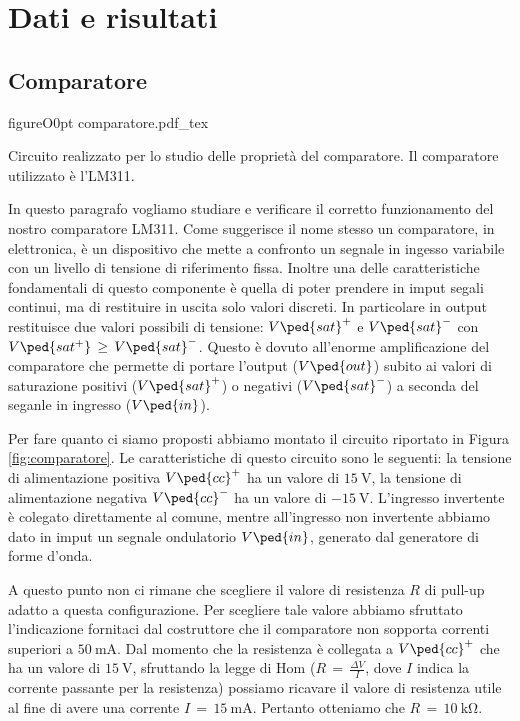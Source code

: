 \section*{Dati e risultati}

\subsection*{Comparatore}

\begin{wrapfloat}{figure}{O}{0pt}
        \def\svgwidth{0.45\textwidth}
        {comparatore.pdf_tex}
        \caption{Circuito realizzato per lo studio delle proprietà del comparatore. Il comparatore utilizzato è l'LM311.}
        \label{fig:comparatore}
\end{wrapfloat}

In questo paragrafo vogliamo studiare e verificare il corretto funzionamento del nostro comparatore LM311. Come suggerisce il nome stesso un comparatore, in elettronica, è un dispositivo che mette a confronto un segnale in ingesso variabile con un livello di tensione di riferimento fissa. Inoltre una delle caratteristiche fondamentali di questo componente è quella di poter prendere in imput segali continui, ma di restituire in uscita solo valori discreti. In particolare in output restituisce due valori possibili di tensione: $V\ped{sat}^+$ e $V\ped{sat}^-$ con $V\ped{sat^+}\,\geq\,V\ped{sat}^-$. Questo è dovuto all'enorme amplificazione del comparatore che permette di portare l'output ($V\ped{out}$) subito ai valori di saturazione positivi ($V\ped{sat}^+$) o negativi ($V\ped{sat}^-$) a seconda del seganle in ingresso ($V\ped{in}$).

Per fare quanto ci siamo proposti abbiamo montato il circuito riportato in Figura \ref{fig:comparatore}. Le caratteristiche di questo circuito sono le seguenti: la tensione di alimentazione positiva $V\ped{cc}^+$ ha un valore di $\SI{+15}{\volt}$, la tensione di alimentazione negativa $V\ped{cc}^-$ ha un valore di $\SI{-15}{\volt}$. L'ingresso invertente è colegato direttamente al comune, mentre all'ingresso non invertente abbiamo dato in imput un segnale ondulatorio $V\ped{in}$, generato dal generatore di forme d'onda.

A questo punto non ci rimane che scegliere il valore di resistenza $R$ di pull-up adatto a questa configurazione. Per scegliere tale valore abbiamo sfruttato l'indicazione fornitaci dal costruttore che il comparatore non sopporta correnti superiori a $\SI{50}{\milli\ampere}$. Dal momento che la resistenza è collegata a $V\ped{cc}^+$ che ha un valore di $\SI{+15}{\volt}$, sfruttando la legge di Hom ($R\,=\,\frac{\Delta V}{I}$, dove $I$ indica la corrente passante per la resistenza) possiamo ricavare il valore di resistenza utile al fine di avere una corrente $I\,=\,\SI{15}{\milli\ampere}$. Pertanto otteniamo che $R\,=\,\SI{10}{\kilo\ohm}$.

